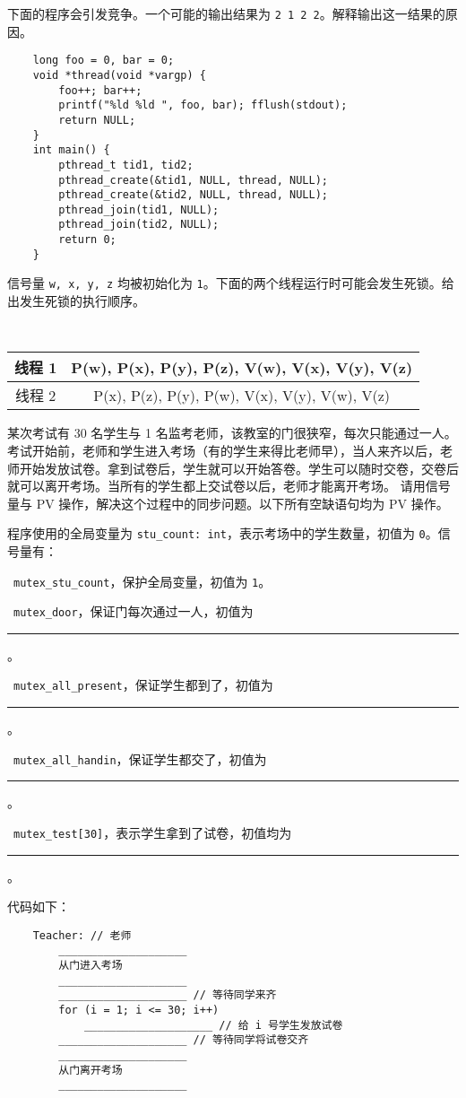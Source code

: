 \begin{problems}
\begin{verbatim}
        \end{verbatim}
        \pro 下面的程序会引发竞争。一个可能的输出结果为 \verb|2 1 2 2|。解释输出这一结果的原因。
        \begin{verbatim}
    long foo = 0, bar = 0;
    void *thread(void *vargp) {
        foo++; bar++;
        printf("%ld %ld ", foo, bar); fflush(stdout);
        return NULL;
    }
    int main() {
        pthread_t tid1, tid2;
        pthread_create(&tid1, NULL, thread, NULL);
        pthread_create(&tid2, NULL, thread, NULL);
        pthread_join(tid1, NULL);
        pthread_join(tid2, NULL);
        return 0;
    }
        \end{verbatim}
        \pro 信号量 \verb|w, x, y, z| 均被初始化为 \verb|1|。下面的两个线程运行时可能会发生死锁。给出发生死锁的执行顺序。
        \begin{table}[H]
            \tt
            \centering
            \begin{tabular}{|c|c|}
                \hline
                线程 1 & P(w), P(x), P(y), P(z), V(w), V(x), V(y), V(z) \\ \hline
                线程 2 & P(x), P(z), P(y), P(w), V(x), V(y), V(w), V(z) \\ \hline
            \end{tabular}
        \end{table}
        \pro 某次考试有 30 名学生与 1 名监考老师，该教室的门很狭窄，每次只能通过一人。考试开始前，老师和学生进入考场（有的学生来得比老师早），当人来齐以后，老师开始发放试卷。拿到试卷后，学生就可以开始答卷。学生可以随时交卷，交卷后就可以离开考场。当所有的学生都上交试卷以后，老师才能离开考场。
        请用信号量与 PV 操作，解决这个过程中的同步问题。以下所有空缺语句均为 PV 操作。

        程序使用的全局变量为 \verb|stu_count: int|，表示考场中的学生数量，初值为 \verb|0|。信号量有：
        \begin{compactitem}
            \item\ \verb|mutex_stu_count|，保护全局变量，初值为 \verb|1|。
            \item\ \verb|mutex_door|，保证门每次通过一人，初值为 \rule{2.5cm}{0.25mm}。
            \item\ \verb|mutex_all_present|，保证学生都到了，初值为 \rule{2.5cm}{0.25mm}。
            \item\ \verb|mutex_all_handin|，保证学生都交了，初值为 \rule{2.5cm}{0.25mm}。
            \item\ \verb|mutex_test[30]|，表示学生拿到了试卷，初值均为 \rule{2.5cm}{0.25mm}。
        \end{compactitem}
        代码如下：
        \begin{verbatim}
    Teacher: // 老师
        ____________________
        从门进入考场
        ____________________
        ____________________ // 等待同学来齐
        for (i = 1; i <= 30; i++)
            ____________________ // 给 i 号学生发放试卷
        ____________________ // 等待同学将试卷交齐
        ____________________
        从门离开考场
        ____________________


\end{verbatim}
\end{problems}
